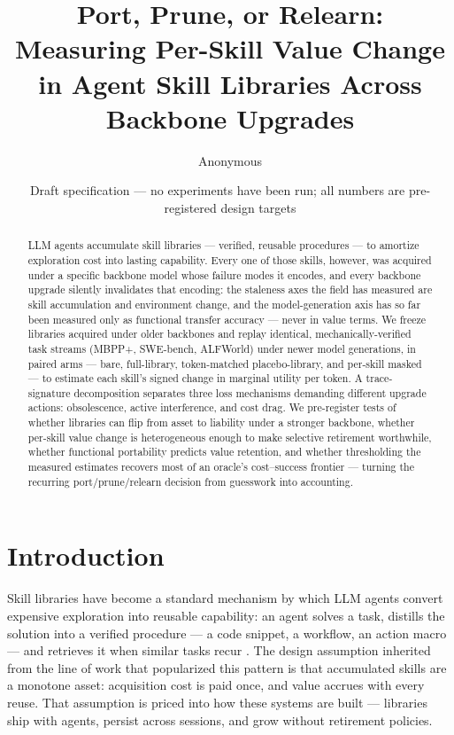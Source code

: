\documentclass[11pt]{article}
\title{Port, Prune, or Relearn: Measuring Per-Skill Value Change in Agent Skill Libraries Across Backbone Upgrades}
\author{Anonymous}
\date{Draft specification --- no experiments have been run; all numbers are pre-registered design targets}
\begin{document}
\maketitle

\begin{abstract}
LLM agents accumulate skill libraries --- verified, reusable procedures --- to amortize exploration cost into lasting capability. Every one of those skills, however, was acquired under a specific backbone model whose failure modes it encodes, and every backbone upgrade silently invalidates that encoding: the staleness axes the field has measured are skill accumulation and environment change, and the model-generation axis has so far been measured only as functional transfer accuracy --- never in value terms. We freeze libraries acquired under older backbones and replay identical, mechanically-verified task streams (MBPP+, SWE-bench, ALFWorld) under newer model generations, in paired arms --- bare, full-library, token-matched placebo-library, and per-skill masked --- to estimate each skill's signed change in marginal utility per token. A trace-signature decomposition separates three loss mechanisms demanding different upgrade actions: obsolescence, active interference, and cost drag. We pre-register tests of whether libraries can flip from asset to liability under a stronger backbone, whether per-skill value change is heterogeneous enough to make selective retirement worthwhile, whether functional portability predicts value retention, and whether thresholding the measured estimates recovers most of an oracle's cost--success frontier --- turning the recurring port/prune/relearn decision from guesswork into accounting.
\end{abstract}

\section{Introduction}

Skill libraries have become a standard mechanism by which LLM agents convert expensive exploration into reusable capability: an agent solves a task, distills the solution into a verified procedure --- a code snippet, a workflow, an action macro --- and retrieves it when similar tasks recur \citep{Voyager2023,AWM2024}. The design assumption inherited from the line of work that popularized this pattern is that accumulated skills are a monotone asset: acquisition cost is paid once, and value accrues with every reuse. That assumption is priced into how these systems are built --- libraries ship with agents, persist across sessions, and grow without retirement policies.
\end{document}
